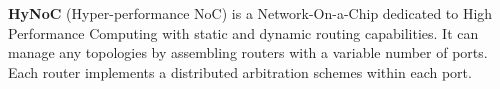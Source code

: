 \textbf{HyNoC} (Hyper-performance NoC) is a Network-On-a-Chip dedicated to High Performance Computing with static and dynamic
routing capabilities. It can manage any topologies by assembling routers with a variable number of ports. Each router
implements a distributed arbitration schemes within each port.
